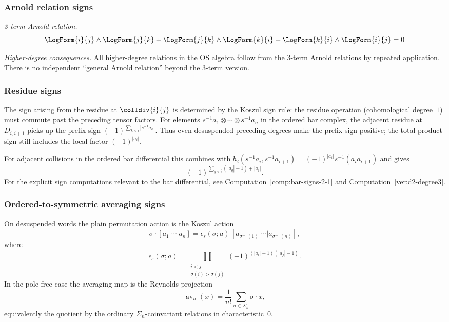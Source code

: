 \subsubsection{Arnold relation signs}

\emph{3-term Arnold relation.}
\[\LogForm{i}{j} \wedge \LogForm{j}{k} + \LogForm{j}{k} \wedge \LogForm{k}{i} + \LogForm{k}{i} \wedge \LogForm{i}{j} = 0\]

\emph{Higher-degree consequences.}
All higher-degree relations in the OS algebra follow from the 3-term Arnold relations by repeated application. There is no independent ``general Arnold relation'' beyond the 3-term version.

\subsubsection{Residue signs}

The sign arising from the residue at $\colldiv{i}{j}$ is determined by the Koszul sign rule: the residue operation (cohomological degree~$1$) must commute past the preceding tensor factors. For elements $s^{-1}a_1 \otimes \cdots \otimes s^{-1}a_n$ in the ordered bar complex, the adjacent residue at $D_{i,i+1}$ picks up the prefix sign $(-1)^{\sum_{k<i}|s^{-1}a_k|}$. Thus even desuspended preceding degrees make the prefix sign positive; the total product sign still includes the local factor $(-1)^{|a_i|}$.

For adjacent collisions in the ordered bar differential this combines with
$b_2(s^{-1}a_i,s^{-1}a_{i+1})=(-1)^{|a_i|}s^{-1}(a_i a_{i+1})$ and gives
\[
(-1)^{\sum_{q<i}(|a_q|-1)+|a_i|}.
\]
For the explicit sign computations relevant to the bar differential, see
Computation~\ref{comp:bar-signs-2-1} and
Computation~\ref{ver:d2-degree3}.

\subsubsection{Ordered-to-symmetric averaging signs}

On desuspended words the plain permutation action is the Koszul action
\[
\sigma\cdot [a_1|\cdots|a_n]
=\epsilon_s(\sigma;a)\,
[a_{\sigma^{-1}(1)}|\cdots|a_{\sigma^{-1}(n)}],
\]
where
\[
\epsilon_s(\sigma;a)
=\prod_{\substack{i<j\\ \sigma(i)>\sigma(j)}}
(-1)^{(|a_i|-1)(|a_j|-1)}.
\]
In the pole-free case the averaging map is the Reynolds projection
\[
\operatorname{av}_n(x)=\frac{1}{n!}\sum_{\sigma\in\Sigma_n}\sigma\cdot x,
\]
equivalently the quotient by the ordinary $\Sigma_n$-coinvariant
relations in characteristic~$0$.

